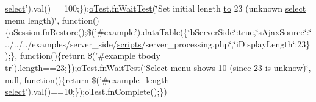 \begin{DoxyCompactItemize}
\hyperlink{validate_8js_a107b4864f70df98ef4a521c0b2bc80c7}{select}').val()==100;\});\hyperlink{onhold_24__server-side_2__zero__config_8js_ab25c4d596771c0133cdc45178ce72c3d}{o\+Test.\+fn\+Wait\+Test}(\char`\"{}Set initial length \hyperlink{jquery-ui_8js_af6086621f45baa2cf538f19e45d3c263}{to} 23 (unknown \hyperlink{validate_8js_a107b4864f70df98ef4a521c0b2bc80c7}{select} menu length)\char`\"{}, function()\{o\+Session.\+fn\+Restore();\$('\#example').data\+Table(\{\char`\"{}b\+Server\+Side\char`\"{}\+:true,\char`\"{}s\+Ajax\+Source\char`\"{}\+:\char`\"{}../../../examples/server\+\_\+side/\hyperlink{tinymce_8jquery_8dev_8js_a09066d4d580eeec222f858d588b4cdef}{scripts}/server\+\_\+processing.\+php\char`\"{},\char`\"{}i\+Display\+Length\char`\"{}\+:23\});\}, function()\{return \$('\#example \hyperlink{core_8constructor_8js_a99b0542c7c50fe8757c55bf9dac5f3be}{tbody} tr').length==23;\});\hyperlink{onhold_24__server-side_2__zero__config_8js_ab25c4d596771c0133cdc45178ce72c3d}{o\+Test.\+fn\+Wait\+Test}(\char`\"{}Select menu shows 10 (since 23 is unknow)\char`\"{}, null, function()\{return \$('\#example\+\_\+length \hyperlink{validate_8js_a107b4864f70df98ef4a521c0b2bc80c7}{select}').val()==10;\});o\+Test.\+fn\+Complete();\})
\end{DoxyCompactItemize}


